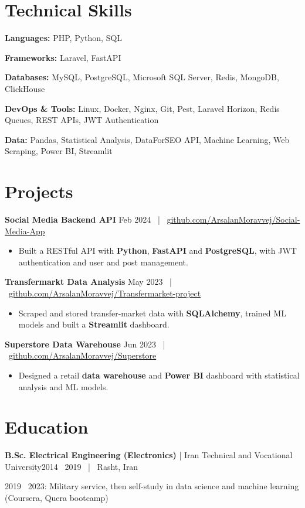 \documentclass[10pt,a4paper]{article}
\newcommand{\skillrow}[2]{{\bfseries\color{accent}#1:} #2\par\vspace{1.5pt}}
\begin{document}
\section{Technical Skills}
\skillrow{Languages}{PHP, Python, SQL}
\skillrow{Frameworks}{Laravel, FastAPI}
\skillrow{Databases}{MySQL, PostgreSQL, Microsoft SQL Server, Redis, MongoDB, ClickHouse}
\skillrow{DevOps \& Tools}{Linux, Docker, Nginx, Git, Pest, Laravel Horizon, Redis Queues, REST APIs, JWT Authentication}
\skillrow{Data}{Pandas, Statistical Analysis, DataForSEO API, Machine Learning, Web Scraping, Power BI, Streamlit}

\section{Projects}
{\bfseries Social Media Backend API} \hfill {\small\color{muted}Feb 2024 \ | \ \href{https://github.com/ArsalanMoravvej/Social-Media-App}{github.com/ArsalanMoravvej/Social-Media-App}}\par
\begin{itemize}
  \item Built a RESTful API with \textbf{Python}, \textbf{FastAPI} and \textbf{PostgreSQL}, with JWT authentication and user and post management.
\end{itemize}
{\bfseries Transfermarkt Data Analysis} \hfill {\small\color{muted}May 2023 \ | \ \href{https://github.com/ArsalanMoravvej/Transfermarket-project}{github.com/ArsalanMoravvej/Transfermarket-project}}\par
\begin{itemize}
  \item Scraped and stored transfer-market data with \textbf{SQLAlchemy}, trained ML models and built a \textbf{Streamlit} dashboard.
\end{itemize}
{\bfseries Superstore Data Warehouse} \hfill {\small\color{muted}Jun 2023 \ | \ \href{https://github.com/ArsalanMoravvej/Superstore}{github.com/ArsalanMoravvej/Superstore}}\par
\begin{itemize}
  \item Designed a retail \textbf{data warehouse} and \textbf{Power BI} dashboard with statistical analysis and ML models.
\end{itemize}

\section{Education}
{\bfseries B.Sc. Electrical Engineering (Electronics)} \textcolor{accent}{| Iran Technical and Vocational University}\hfill {\small\color{muted}2014 \textendash\ 2019 \ | \ Rasht, Iran}\par
{\small\color{muted}2019 \textendash\ 2023: Military service, then self-study in data science and machine learning (Coursera, Quera bootcamp)}\par
\end{document}
